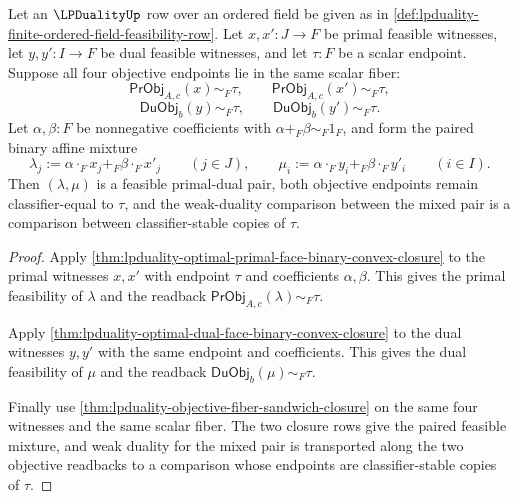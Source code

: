 \begin{theorem}
\label{thm:lpduality-primal-dual-affine-fiber-product-closure}
Let an $\LPDualityUp$ row over an ordered field be given as in
\autoref{def:lpduality-finite-ordered-field-feasibility-row}. Let
$x,x':J\to F$ be primal feasible witnesses, let $y,y':I\to F$ be dual
feasible witnesses, and let $\tau:F$ be a scalar endpoint. Suppose all four
objective endpoints lie in the same scalar fiber:
$$
\mathsf{PrObj}_{A,c}(x)\sim_F\tau,
\qquad
\mathsf{PrObj}_{A,c}(x')\sim_F\tau,
$$
$$
\mathsf{DuObj}_{b}(y)\sim_F\tau,
\qquad
\mathsf{DuObj}_{b}(y')\sim_F\tau.
$$
Let $\alpha,\beta:F$ be nonnegative coefficients with
$\alpha+_F\beta\sim_F1_F$, and form the paired binary affine mixture
$$
\lambda_j:=\alpha\cdot_Fx_j+_F\beta\cdot_Fx'_j
\qquad (j\in J),
\qquad
\mu_i:=\alpha\cdot_Fy_i+_F\beta\cdot_Fy'_i
\qquad (i\in I).
$$
Then $(\lambda,\mu)$ is a feasible primal-dual pair, both objective endpoints
remain classifier-equal to $\tau$, and the weak-duality comparison between
the mixed pair is a comparison between classifier-stable copies of $\tau$.
\end{theorem}
\begin{proof}
Apply
\autoref{thm:lpduality-optimal-primal-face-binary-convex-closure} to the
primal witnesses $x,x'$ with endpoint $\tau$ and coefficients
$\alpha,\beta$. This gives the primal feasibility of $\lambda$ and the
readback $\mathsf{PrObj}_{A,c}(\lambda)\sim_F\tau$.

Apply
\autoref{thm:lpduality-optimal-dual-face-binary-convex-closure} to the dual
witnesses $y,y'$ with the same endpoint and coefficients. This gives the dual
feasibility of $\mu$ and the readback
$\mathsf{DuObj}_{b}(\mu)\sim_F\tau$.

Finally use
\autoref{thm:lpduality-objective-fiber-sandwich-closure} on the same four
witnesses and the same scalar fiber. The two closure rows give the paired
feasible mixture, and weak duality for the mixed pair is transported along
the two objective readbacks to a comparison whose endpoints are
classifier-stable copies of $\tau$.
\end{proof}

